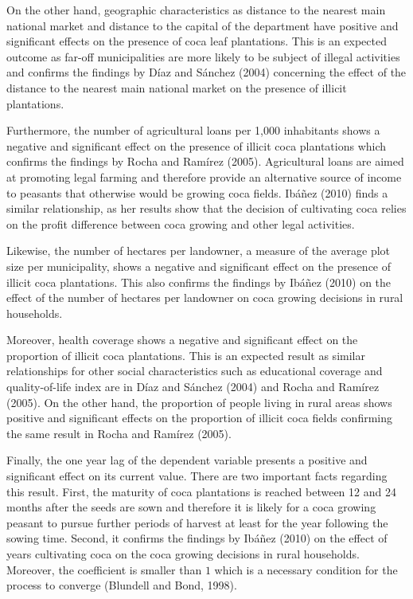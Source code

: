 \documentclass[a4paper, 12pt]{article}
\begin{document}
On the other hand, geographic characteristics as distance to the nearest main national market and distance to the capital of the department have positive and significant effects on the presence of coca leaf plantations. This is an expected outcome as far-off municipalities are more likely to be subject of illegal activities and confirms the findings by D\'{i}az and S\'{a}nchez (2004) concerning the effect of the distance to the nearest main national market on the presence of illicit plantations.

Furthermore, the number of agricultural loans per 1,000 inhabitants shows a negative and significant effect on the presence of illicit coca plantations which confirms the findings by Rocha and Ram\'{i}rez (2005). Agricultural loans are aimed at promoting legal farming and therefore provide an alternative source of income to peasants that otherwise would be growing coca fields. Ib\'{a}\~{n}ez (2010) finds a similar relationship, as her results show that the decision of cultivating coca relies on the profit difference between coca growing and other legal activities.

Likewise, the number of hectares per landowner, a measure of the average plot size per municipality, shows a negative and significant effect on the presence of illicit coca plantations. This also confirms the findings by Ib\'{a}\~{n}ez (2010) on the effect of the number of hectares per landowner on coca growing decisions in rural households.

Moreover, health coverage shows a negative and significant effect on the proportion of illicit coca plantations. This is an expected result as similar relationships for other social characteristics such as educational coverage and quality-of-life index are in D\'{i}az and S\'{a}nchez (2004) and Rocha and Ram\'{i}rez (2005). On the other hand, the proportion of people living in rural areas shows positive and significant effects on the proportion of illicit coca fields confirming the same result in Rocha and Ram\'{i}rez (2005).

Finally, the one year lag of the dependent variable presents a positive and significant effect on its current value. There are two important facts regarding this result. First, the maturity of coca plantations is reached between 12 and 24 months after the seeds are sown and therefore it is likely for a coca growing peasant to pursue further periods of harvest at least for the year following the sowing time. Second, it confirms the findings by Ib\'{a}\~{n}ez (2010) on the effect of years cultivating coca on the coca growing decisions in rural households. Moreover, the coefficient is smaller than $1$ which is a necessary condition for the process to converge (Blundell and Bond, 1998).
\end{document}

